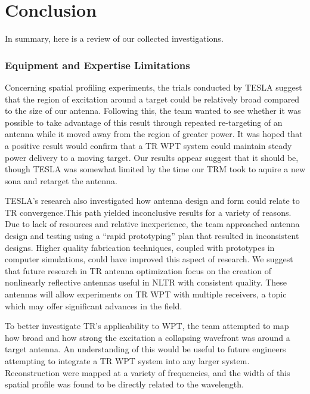 \chapter{Conclusion}

\label{ch:conclusion}

In summary, here is a review of our collected investigations.

\subsection{Equipment and Expertise Limitations}


Concerning spatial profiling experiments, the trials conducted by TESLA suggest that the region of excitation around a target could be relatively broad compared to the size of our antenna. Following this, the team wanted to see whether it was possible to take advantage of this result through repeated re-targeting of an antenna while it moved away from the region of greater power. It was hoped that a positive result  would confirm that a TR WPT system could maintain steady power delivery to a moving target. Our results appear suggest that it should be, though TESLA was somewhat limited by the time our TRM took to aquire a new sona and retarget the antenna.

TESLA's research also investigated how antenna design and form could relate to TR convergence.This path yielded inconclusive results for a variety of reasons. Due to lack of resources and relative inexperience, the team approached antenna design and testing using a ``rapid prototyping'' plan that resulted in inconsistent designs. Higher quality fabrication techniques, coupled with prototypes in computer simulations, could have improved this aspect of research.  We suggest that future research in TR antenna optimization focus on the creation of nonlinearly reflective antennas useful in NLTR with consistent quality.  These antennas will allow experiments on TR WPT with multiple receivers, a topic which may offer significant advances in the field.

To better investigate TR's applicability to WPT, the team attempted to map how broad and how strong the excitation a collapsing wavefront was around a target antenna. An understanding of this would be useful to future engineers attempting to integrate a TR WPT system into any larger system. Reconstruction were mapped at a variety of frequencies, and the width of this spatial profile was found to be directly related to the wavelength.

